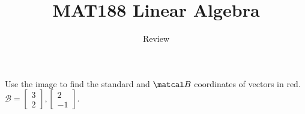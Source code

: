 \documentclass[english,9pt,xcolor=dvipsnames,notheorems]{beamer}
\begin{document}
	
	\title{MAT188 Linear Algebra}
	\subtitle{Review}

	
	\begin{frame}
		\maketitle
		
%		
%		
		
	\end{frame}

\begin{frame}
\small{
\vspace{-3 cm}

}
\end{frame}


\begin{frame}
 \vspace{-5 cm}
\PullLS[ch3-VG-vecbas]
 
 \hline
 \vspace{1 cm}
 
Use the image to find the standard and $\matcal B $ coordinates of vectors in red. $\mathcal B=\begin{bmatrix}
    3\\2
\end{bmatrix}, \begin{bmatrix}
    2\\-1
\end{bmatrix}$.
\end{frame}
\end{document}
